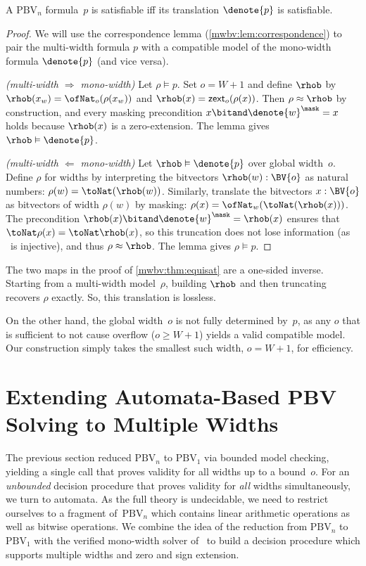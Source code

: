 \begin{theorem}[Equisatisfiability]\label{mwbv:thm:equisat}
A $\text{PBV}_n$ formula~$p$ is satisfiable iff its translation $\denote{p}$ is satisfiable.
\end{theorem}
\begin{proof}
We will use the correspondence lemma (\cref{mwbv:lem:correspondence})
to pair the multi-width formula $p$ with a compatible model of the mono-width formula $\denote{p}$ (and vice versa).

\emph{(multi-width $\Rightarrow$ mono-width)} Let $\rho \vDash p$. Set $o = W + 1$ and define $\rhob$ by
$\rhob(x_w) = \ofNat_o(\rho(x_w))$ and $\rhob(x) = \mathsf{zext}_o(\rho(x))$.
Then $\rho \approx \rhob$ by construction, and every masking precondition
$x \bitand \denote{w}^\mask = x$ holds because $\rhob(x)$ is a zero-extension.
The lemma gives $\rhob \vDash \denote{p}$.

\emph{(multi-width $\Leftarrow$ mono-width)} Let $\rhob \vDash \denote{p}$ over global width~$o$. Define
$\rho$ for widths by interpreting the bitvectors $\rhob(w) : \BV{o}$ as natural numbers: $\rho(w) = \toNat(\rhob(w))$.
Similarly, translate the bitvectors $x : \BV{o}$ as bitvectors of width
$\rho(w)$ by masking: $\rho(x) = \ofNat_w (\toNat (\rhob(x)))$.
The precondition $\rhob(x) \bitand \denote{w}^\mask = \rhob(x)$ ensures that $\toNat \rho(x) = \toNat \rhob(x)$, so
this truncation does not lose information (as \toNat~is injective), and thus $\rho \approx \rhob$. The lemma gives $\rho \vDash p$.
\end{proof}

\begin{remark}\label{mwbv:rem:width-choice}
The two maps in the proof of \cref{mwbv:thm:equisat} are a one-sided inverse.
Starting from a multi-width model~$\rho$, building $\rhob$ and then truncating recovers $\rho$ exactly.
So, this translation is lossless.

On the other hand, the global width~$o$ is not fully determined by~$p$, as any $o$
that is sufficient to not cause overflow ($o \ge W + 1$) yields a valid compatible model.
Our construction simply takes the smallest such width, $o = W + 1$, for efficiency.
\end{remark}


\section{Extending Automata-Based PBV Solving to Multiple Widths}
\label{sec:mwbv:automata}
The previous section reduced $\text{PBV}_n$ to $\text{PBV}_1$ via bounded model
checking, yielding a single \qfbv{} call that proves validity for all widths up
to a bound~$o$.
%
For an \emph{unbounded} decision procedure that proves validity for
\emph{all} widths simultaneously, we turn to automata.
%
As the full theory is undecidable, we need to restrict ourselves to a fragment
of~$\text{PBV}_n$ which contains linear arithmetic operations as well as bitwise
operations.
%
We combine the idea of the reduction from $\text{PBV}_n$ to $\text{PBV}_1$ with
the verified mono-width solver of~\citet{bhat2025certified} to build a decision
procedure which supports multiple widths and zero and sign extension.


